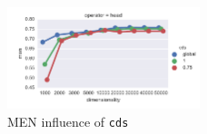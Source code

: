 \begin{figure}[b]
  \centering

  \includegraphics[width=0.5\textwidth]{supplement/figures/men-interaction-cds}

  \caption{MEN influence of \texttt{cds}}
  \label{fig:men-cds}
\end{figure}
